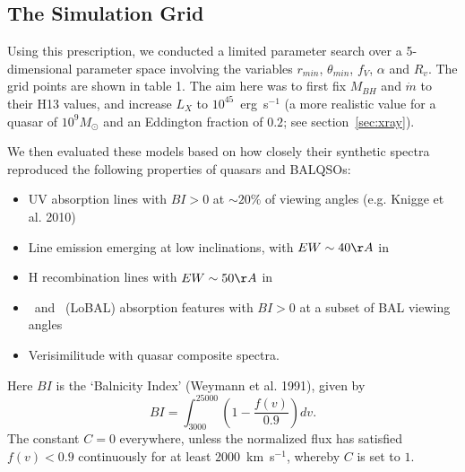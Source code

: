 \documentclass[useAMS,usenatbib]{mn2e_x}
\begin{document}


\subsection{The Simulation Grid}

Using this prescription, we conducted a limited parameter
search over a 5-dimensional parameter space involving the 
variables $r_{min}$, $\theta_{min}$, $f_V$, $\alpha$ and $R_v$.
The grid points are shown in table 1.
The aim here was to first fix $M_{BH}$ and $\dot{m}$ to their H13 values,
and increase $L_X$ to $10^{45}$~erg~s$^{-1}$ (a more realistic value for a 
quasar of $10^9M_\odot$ and an Eddington fraction of $0.2$; see section~\ref{sec:xray}).

We then evaluated these models based on 
how closely their synthetic spectra reproduced the 
following properties of quasars and BALQSOs:

\begin{itemize}
\item UV absorption lines 
with $BI > 0$ at $\sim20\%$ of viewing angles (e.g. Knigge et al. 2010)
\item Line emission emerging at low inclinations, with $EW\sim40\AA$ in \civ\ \citep[e.g. ][]{shen2011}
\item H recombination lines with $EW\sim50\AA$ in \la\ \citep[e.g. ][]{shen2011}
\item  \mg\ and \al\ (LoBAL) absorption features with $BI > 0$ at a subset of 
BAL viewing angles
\item Verisimilitude with quasar composite spectra.
\end{itemize}
Here $BI$ is the `Balnicity Index' (Weymann et al. 1991), given by
\begin{equation}
BI = \int^{25000}_{3000} \left( 1 - \frac{f(v)}{0.9} \right) dv.
\end{equation}
The constant $C=0$ everywhere, unless the normalized flux
has satisfied $f(v)<0.9$ continuously for at least $2000$~km~s$^{−1}$, 
whereby $C$ is set to $1$.
\end{document}
